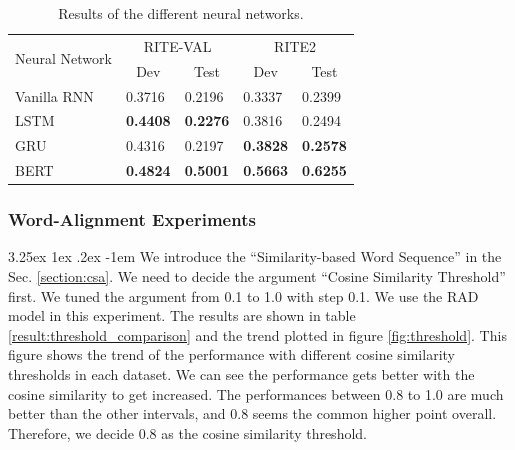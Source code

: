 \documentclass[12pt]{article}
\makeatletter
\renewcommand\paragraph{\@startsection{paragraph}{5}{\z@}%
  {3.25ex \@plus1ex \@minus.2ex}%
  {-1em}%
  {\normalfont\normalsize\bfseries}}
\makeatother
\begin{document}
\begin{CJK*}{UTF8}{bkai}
\begin{spacing}{1.77}
\begin{table}[H]
  \centering
  \setlength{\extrarowheight}{-3pt}
  \begin{tabular}{|l|l|l|l|l|}
  \hline
  \multirow{2}{*}{Neural Network} & \multicolumn{2}{c|}{RITE-VAL} & \multicolumn{2}{c|}{RITE2} \\ \cline{2-5}
   & \multicolumn{1}{c|}{Dev} & \multicolumn{1}{c|}{Test} & \multicolumn{1}{c|}{Dev} & \multicolumn{1}{c|}{Test} \\ \hline
  Vanilla RNN & 0.3716 & 0.2196 & 0.3337 & 0.2399 \\ \hline
  LSTM & \textbf{0.4408} & \textbf{0.2276} & 0.3816 & 0.2494 \\ \hline
  GRU & 0.4316 & 0.2197 & \textbf{0.3828} & \textbf{0.2578} \\ \hline
  BERT & \textbf{0.4824} & \textbf{0.5001} & \textbf{0.5663} & \textbf{0.6255} \\ \hline
  \end{tabular}
  \caption{Results of the different neural networks.}
  \label{result:rnn_types}
\end{table}

\subsubsection{Word-Alignment Experiments}
\paragraph{}
We introduce the ``Similarity-based Word Sequence'' in the Sec. \ref{section:csa}. We need to decide the argument ``Cosine Similarity Threshold'' first. We tuned the argument from 0.1 to 1.0 with step 0.1. We use the RAD model in this experiment. The results are shown in table \ref{result:threshold_comparison} and the trend plotted in figure \ref{fig:threshold}. This figure shows the trend of the performance with different cosine similarity thresholds in each dataset. We can see the performance gets better with the cosine similarity to get increased. The performances between 0.8 to 1.0 are much better than the other intervals, and 0.8 seems the common higher point overall. Therefore, we decide 0.8 as the cosine similarity threshold.


\end{spacing}
\end{CJK*}
\end{document}

